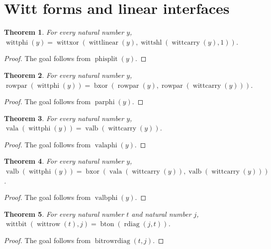\documentclass[11pt]{article}
\newtheorem{theorem}{Theorem}[section]
\theoremstyle{definition}
\begin{document}
\section{Witt forms and linear interfaces}
\label{ll:paper:witt-interfaces}
\begin{theorem}
\label{ll:paper:witt-split}
For every natural number \(y\), \(\operatorname{wittphi}(y) = \operatorname{wittxor}(\operatorname{wittlinear}(y), \operatorname{wittshl}(\operatorname{wittcarry}(y), 1))\).
\end{theorem}
\begin{proof}
The goal follows from \(\operatorname{phisplit}(y)\).
\end{proof}
\begin{theorem}
\label{ll:paper:parity-interface}
For every natural number \(y\), \(\operatorname{rowpar}(\operatorname{wittphi}(y)) = \operatorname{bxor}(\operatorname{rowpar}(y), \operatorname{rowpar}(\operatorname{wittcarry}(y)))\).
\end{theorem}
\begin{proof}
The goal follows from \(\operatorname{parphi}(y)\).
\end{proof}
\begin{theorem}
\label{ll:paper:cyclotomic-first-interface}
For every natural number \(y\), \(\operatorname{vala}(\operatorname{wittphi}(y)) = \operatorname{valb}(\operatorname{wittcarry}(y))\).
\end{theorem}
\begin{proof}
The goal follows from \(\operatorname{valaphi}(y)\).
\end{proof}
\begin{theorem}
\label{ll:paper:cyclotomic-second-interface}
For every natural number \(y\), \(\operatorname{valb}(\operatorname{wittphi}(y)) = \operatorname{bxor}(\operatorname{vala}(\operatorname{wittcarry}(y)), \operatorname{valb}(\operatorname{wittcarry}(y)))\).
\end{theorem}
\begin{proof}
The goal follows from \(\operatorname{valbphi}(y)\).
\end{proof}
\begin{theorem}
\label{ll:paper:witt-row-rdiag}
For every natural number \(t\) and natural number \(j\), \(\operatorname{wittbit}(\operatorname{wittrow}(t), j) = \operatorname{bton}(\operatorname{rdiag}(j, t))\).
\end{theorem}
\begin{proof}
The goal follows from \(\operatorname{bitrowrdiag}(t, j)\).
\end{proof}
\end{document}
